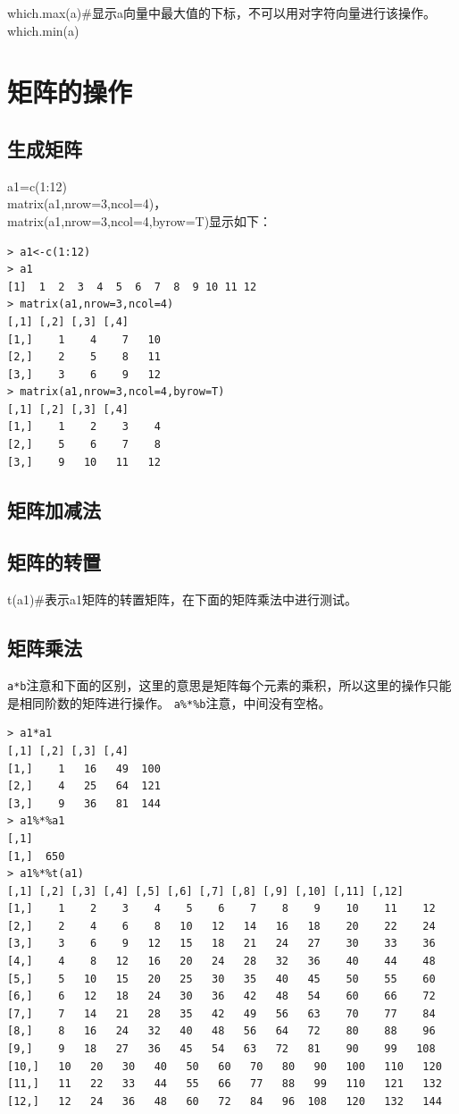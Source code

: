 \documentclass[a4paper,12pt]{ctexbook}
\begin{document}
\begin{flushleft}
which.max(a)\#显示a向量中最大值的下标，不可以用对字符向量进行该操作。\\
which.min(a)

\section{矩阵的操作}
\subsection{生成矩阵}
a1=c(1:12)\\
matrix(a1,nrow=3,ncol=4)，\\
matrix(a1,nrow=3,ncol=4,byrow=T)显示如下：
\begin{verbatim}
> a1<-c(1:12)
> a1
[1]  1  2  3  4  5  6  7  8  9 10 11 12
> matrix(a1,nrow=3,ncol=4)
[,1] [,2] [,3] [,4]
[1,]    1    4    7   10
[2,]    2    5    8   11
[3,]    3    6    9   12
> matrix(a1,nrow=3,ncol=4,byrow=T)
[,1] [,2] [,3] [,4]
[1,]    1    2    3    4
[2,]    5    6    7    8
[3,]    9   10   11   12
\end{verbatim}
\subsection{矩阵加减法}
\subsection{矩阵的转置}
t(a1)\#表示a1矩阵的转置矩阵，在下面的矩阵乘法中进行测试。
\subsection{矩阵乘法}
\verb|a*b|注意和下面的区别，这里的意思是矩阵每个元素的乘积，所以这里的操作只能是相同阶数的矩阵进行操作。
\verb|a%*%b|注意，中间没有空格。
\begin{verbatim}
> a1*a1
[,1] [,2] [,3] [,4]
[1,]    1   16   49  100
[2,]    4   25   64  121
[3,]    9   36   81  144
> a1%*%a1
[,1]
[1,]  650
> a1%*%t(a1)
[,1] [,2] [,3] [,4] [,5] [,6] [,7] [,8] [,9] [,10] [,11] [,12]
[1,]    1    2    3    4    5    6    7    8    9    10    11    12
[2,]    2    4    6    8   10   12   14   16   18    20    22    24
[3,]    3    6    9   12   15   18   21   24   27    30    33    36
[4,]    4    8   12   16   20   24   28   32   36    40    44    48
[5,]    5   10   15   20   25   30   35   40   45    50    55    60
[6,]    6   12   18   24   30   36   42   48   54    60    66    72
[7,]    7   14   21   28   35   42   49   56   63    70    77    84
[8,]    8   16   24   32   40   48   56   64   72    80    88    96
[9,]    9   18   27   36   45   54   63   72   81    90    99   108
[10,]   10   20   30   40   50   60   70   80   90   100   110   120
[11,]   11   22   33   44   55   66   77   88   99   110   121   132
[12,]   12   24   36   48   60   72   84   96  108   120   132   144
\end{verbatim}


\end{flushleft}
\end{document}
